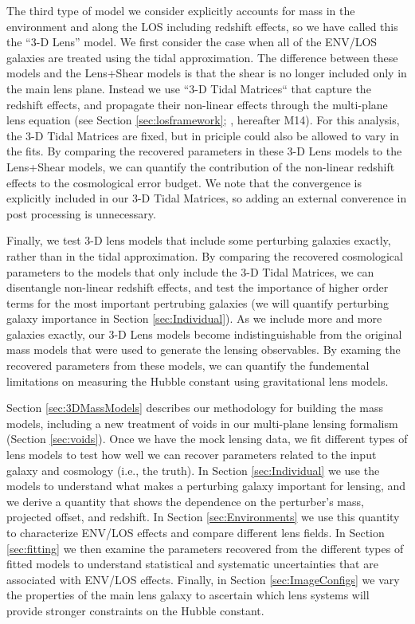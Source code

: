 \documentclass{emulateapj}
\begin{document}
The third type of model we consider explicitly accounts for mass in the environment and along the LOS including redshift effects, so we have called this the ``3-D Lens'' model. We first consider the case when all of the ENV/LOS galaxies are treated using the tidal approximation. The difference between these models and the Lens+Shear models is that the shear is no longer included only in the main lens plane. Instead we use ``3-D Tidal Matrices`` that capture the redshift effects, and propagate their non-linear effects through the multi-plane lens equation (see Section \ref{sec:losframework}; \citealt{McCully14}, hereafter M14). For this analysis, the 3-D Tidal Matrices are fixed, but in priciple could also be allowed to vary in the fits. By comparing the recovered parameters in these 3-D Lens models to the Lens+Shear models, we can quantify the contribution of the non-linear redshift effects to the cosmological error budget. We note that the convergence is explicitly included in our 3-D Tidal Matrices, so adding an external converence in post processing is unnecessary.

Finally, we test 3-D lens models that include some perturbing galaxies exactly, rather than in the tidal approximation. By comparing the recovered cosmological parameters to the models that only include the 3-D Tidal Matrices, we can disentangle non-linear redshift effects, and test the importance of higher order terms for the most important pertrubing galaxies (we will quantify perturbing galaxy importance in Section \ref{sec:Individual}). As we include more and more galaxies exactly, our 3-D Lens models become indistinguishable from the original mass models that were used to generate the lensing observables. By examing the recovered parameters from these models, we can quantify the fundemental limitations on measuring the Hubble constant using gravitational lens models.

 Section \ref{sec:3DMassModels} describes our methodology for building the mass models, including a new treatment of voids in our multi-plane lensing formalism (Section \ref{sec:voids}). Once we have the mock lensing data, we fit different types of lens models to test how well we can recover parameters related to the input galaxy and cosmology (i.e., the truth).  In Section \ref{sec:Individual} we use the models to understand what makes a perturbing galaxy important for lensing, and we derive a quantity that shows the dependence on the perturber's mass, projected offset, and redshift. In Section \ref{sec:Environments} we use this quantity to characterize ENV/LOS effects and compare different lens fields. In Section \ref{sec:fitting} we then examine the parameters recovered from the different types of fitted models to understand statistical and systematic uncertainties that are associated with ENV/LOS effects. Finally, in Section \ref{sec:ImageConfigs} we vary the properties of the main lens galaxy to ascertain which lens systems will provide stronger constraints on the Hubble constant.
\end{document}
